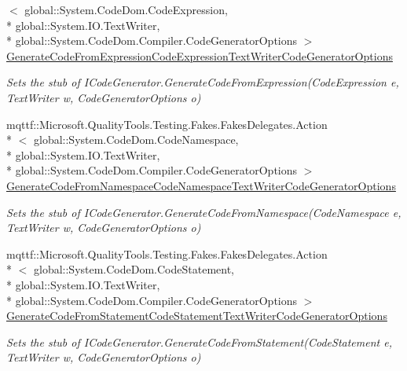 \begin{DoxyCompactItemize}
$<$ global\-::\-System.\-Code\-Dom.\-Code\-Expression, \\*
global\-::\-System.\-I\-O.\-Text\-Writer, \\*
global\-::\-System.\-Code\-Dom.\-Compiler.\-Code\-Generator\-Options $>$ \hyperlink{class_system_1_1_code_dom_1_1_compiler_1_1_fakes_1_1_stub_i_code_generator_af3f2a6d0f58b28dc41cb8dafa1a63375}{Generate\-Code\-From\-Expression\-Code\-Expression\-Text\-Writer\-Code\-Generator\-Options}
\begin{DoxyCompactList}\small\item\em Sets the stub of I\-Code\-Generator.\-Generate\-Code\-From\-Expression(\-Code\-Expression e, Text\-Writer w, Code\-Generator\-Options o)\end{DoxyCompactList}\item 
mqttf\-::\-Microsoft.\-Quality\-Tools.\-Testing.\-Fakes.\-Fakes\-Delegates.\-Action\\*
$<$ global\-::\-System.\-Code\-Dom.\-Code\-Namespace, \\*
global\-::\-System.\-I\-O.\-Text\-Writer, \\*
global\-::\-System.\-Code\-Dom.\-Compiler.\-Code\-Generator\-Options $>$ \hyperlink{class_system_1_1_code_dom_1_1_compiler_1_1_fakes_1_1_stub_i_code_generator_ac49b5e519ec7f58fa56eb050be556e5c}{Generate\-Code\-From\-Namespace\-Code\-Namespace\-Text\-Writer\-Code\-Generator\-Options}
\begin{DoxyCompactList}\small\item\em Sets the stub of I\-Code\-Generator.\-Generate\-Code\-From\-Namespace(\-Code\-Namespace e, Text\-Writer w, Code\-Generator\-Options o)\end{DoxyCompactList}\item 
mqttf\-::\-Microsoft.\-Quality\-Tools.\-Testing.\-Fakes.\-Fakes\-Delegates.\-Action\\*
$<$ global\-::\-System.\-Code\-Dom.\-Code\-Statement, \\*
global\-::\-System.\-I\-O.\-Text\-Writer, \\*
global\-::\-System.\-Code\-Dom.\-Compiler.\-Code\-Generator\-Options $>$ \hyperlink{class_system_1_1_code_dom_1_1_compiler_1_1_fakes_1_1_stub_i_code_generator_a871d5b7c61f29c1e5b96d8c6b92cbf01}{Generate\-Code\-From\-Statement\-Code\-Statement\-Text\-Writer\-Code\-Generator\-Options}
\begin{DoxyCompactList}\small\item\em Sets the stub of I\-Code\-Generator.\-Generate\-Code\-From\-Statement(\-Code\-Statement e, Text\-Writer w, Code\-Generator\-Options o)\end{DoxyCompactList}\item 

\end{DoxyCompactItemize}
